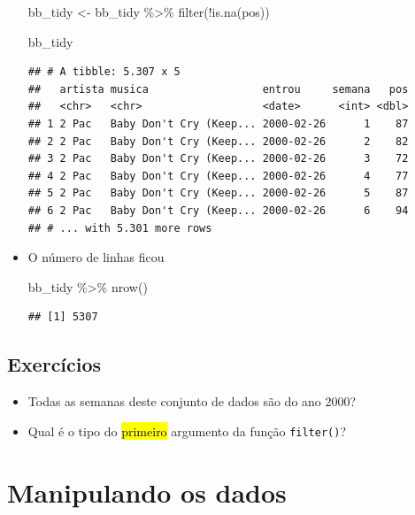\documentclass[
  11pt]{report}
\newenvironment{Shaded}{\begin{snugshade}}{\end{snugshade}}
\newcommand{\FunctionTok}[1]{\textcolor[rgb]{0.00,0.00,0.00}{#1}}
\newcommand{\NormalTok}[1]{#1}
\newcommand{\OtherTok}[1]{\textcolor[rgb]{0.56,0.35,0.01}{#1}}
\newcommand{\SpecialCharTok}[1]{\textcolor[rgb]{0.00,0.00,0.00}{#1}}
\renewenvironment{Shaded}{
    \begin{mdframed}[%
      roundcorner=2pt,%
      innerleftmargin=5pt,%
      innerrightmargin=5pt,%
      topline=true,%
      leftline=true,%
      rightline=true,%
      bottomline=true,%
      linewidth=0.5pt,%
      linecolor=black!20,%
      backgroundcolor=black!2,%
      skipabove=2ex,%
      skipbelow=2.5ex%
    ]%
  }
  {
    \end{mdframed}
  }
\begin{document}
\begin{itemize}
\begin{Shaded}
\begin{Highlighting}[]
\NormalTok{bb\_tidy }\OtherTok{\textless{}{-}}\NormalTok{ bb\_tidy }\SpecialCharTok{\%\textgreater{}\%} 
  \FunctionTok{filter}\NormalTok{(}\SpecialCharTok{!}\FunctionTok{is.na}\NormalTok{(pos))}

\NormalTok{bb\_tidy}
\end{Highlighting}
\end{Shaded}

\begin{verbatim}
## # A tibble: 5.307 x 5
##   artista musica                  entrou     semana   pos
##   <chr>   <chr>                   <date>      <int> <dbl>
## 1 2 Pac   Baby Don't Cry (Keep... 2000-02-26      1    87
## 2 2 Pac   Baby Don't Cry (Keep... 2000-02-26      2    82
## 3 2 Pac   Baby Don't Cry (Keep... 2000-02-26      3    72
## 4 2 Pac   Baby Don't Cry (Keep... 2000-02-26      4    77
## 5 2 Pac   Baby Don't Cry (Keep... 2000-02-26      5    87
## 6 2 Pac   Baby Don't Cry (Keep... 2000-02-26      6    94
## # ... with 5.301 more rows
\end{verbatim}
\item
  O número de linhas ficou

\begin{Shaded}
\begin{Highlighting}[]
\NormalTok{bb\_tidy }\SpecialCharTok{\%\textgreater{}\%} \FunctionTok{nrow}\NormalTok{()}
\end{Highlighting}
\end{Shaded}

\begin{verbatim}
## [1] 5307
\end{verbatim}
\end{itemize}

\hypertarget{exercuxedcios-3}{%
\subsection{Exercícios}\label{exercuxedcios-3}}

\begin{itemize}
\item
  Todas as semanas deste conjunto de dados são do ano $2000$?
\item
  Qual é o tipo do {\hl{primeiro}} argumento da função \texttt{filter()}?
\end{itemize}

\hypertarget{manipulando-os-dados}{%
\section{Manipulando os dados}\label{manipulando-os-dados}}
\end{document}
